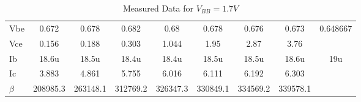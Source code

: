 \begin{table}[H]
\begin{tabular}{ccccccccc}
                \multicolumn{1}{l|}{Vbe}     & \multicolumn{1}{c}{0.672}    & \multicolumn{1}{c}{0.678}    & \multicolumn{1}{c}{0.682}    & \multicolumn{1}{c}{0.68}     & \multicolumn{1}{c}{0.678}    & \multicolumn{1}{c}{0.676}    & \multicolumn{1}{c}{0.673}    & 0.648667 \\ 
                \multicolumn{1}{l|}{Vce}     & \multicolumn{1}{c}{0.156}    & \multicolumn{1}{c}{0.188}    & \multicolumn{1}{c}{0.303}    & \multicolumn{1}{c}{1.044}    & \multicolumn{1}{c}{1.95}     & \multicolumn{1}{c}{2.87}     & \multicolumn{1}{c}{3.76}     &          \\ 
                \multicolumn{1}{l|}{Ib}      & \multicolumn{1}{c}{18.6u}    & \multicolumn{1}{c}{18.5u}    & \multicolumn{1}{c}{18.4u}    & \multicolumn{1}{c}{18.4u}    & \multicolumn{1}{c}{18.5u}    & \multicolumn{1}{c}{18.5u}    & \multicolumn{1}{c}{18.6u}    & 19u      \\ 
                \multicolumn{1}{l|}{Ic}      & \multicolumn{1}{c}{3.883}    & \multicolumn{1}{c}{4.861}    & \multicolumn{1}{c}{5.755}    & \multicolumn{1}{c}{6.016}    & \multicolumn{1}{c}{6.111}    & \multicolumn{1}{c}{6.192}    & \multicolumn{1}{c}{6.303}    &          \\ 
                \multicolumn{1}{l|}{$\beta$} & \multicolumn{1}{c}{208985.3} & \multicolumn{1}{c}{263148.1} & \multicolumn{1}{c}{312769.2} & \multicolumn{1}{c}{326347.3} & \multicolumn{1}{c}{330849.1} & \multicolumn{1}{c}{334569.2} & \multicolumn{1}{c}{339578.1} &          \\ 
                \hline
                \end{tabular}
                \caption{Measured Data for $V_{BB}=1.7V$}
                \end{table}

                \FloatBarrier

